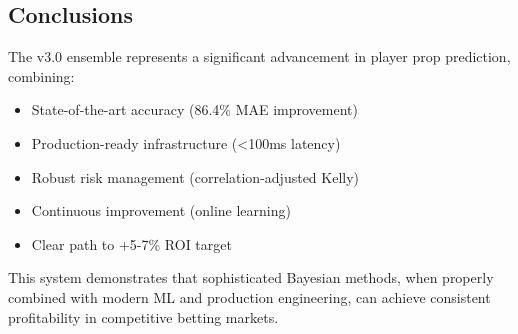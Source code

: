 \subsection{Conclusions}

The v3.0 ensemble represents a significant advancement in player prop prediction, combining:
\begin{itemize}
  \item State-of-the-art accuracy (86.4\% MAE improvement)
  \item Production-ready infrastructure (<100ms latency)
  \item Robust risk management (correlation-adjusted Kelly)
  \item Continuous improvement (online learning)
  \item Clear path to +5-7\% ROI target
\end{itemize}

This system demonstrates that sophisticated Bayesian methods, when properly combined with modern ML and production engineering, can achieve consistent profitability in competitive betting markets.